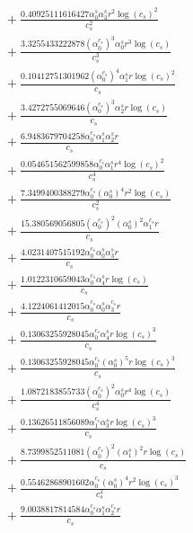 \documentclass[10pt]{article}
\begin{document}
\begin{align*}
&{}  + \frac{0.40925111616427 \alpha_{0}^s \alpha_{3}^s r^{2} \log{\left(c_{s} \right)}^{2}}{c_{s}^{2}} \\
&{}  + \frac{3.3255433222878 \left(\alpha_{0}^{c_s}\right)^{3} \alpha_{0}^s r^{3} \log{\left(c_{s} \right)}}{c_{s}^{3}} \\
&{}  + \frac{0.10412751301962 \left(\alpha_{0}^{c_s}\right)^{4} \alpha_{1}^s r \log{\left(c_{s} \right)}^{2}}{c_{s}} \\
&{}  + \frac{3.4272755069646 \left(\alpha_{0}^{c_s}\right)^{3} \alpha_{2}^s r \log{\left(c_{s} \right)}}{c_{s}} \\
&{}  + \frac{6.9483679704258 \alpha_{0}^{c_s} \alpha_{1}^s \alpha_{2}^s r}{c_{s}} \\
&{}  + \frac{0.054651562599858 \alpha_{0}^{c_s} \alpha_{1}^s r^{4} \log{\left(c_{s} \right)}^{2}}{c_{s}^{4}} \\
&{}  + \frac{7.3499400388279 \alpha_{0}^{c_s} \left(\alpha_{0}^s\right)^{4} r^{2} \log{\left(c_{s} \right)}}{c_{s}^{2}} \\
&{}  + \frac{15.380569056805 \left(\alpha_{0}^{c_s}\right)^{2} \left(\alpha_{0}^s\right)^{2} \alpha_{1}^{c_s} r}{c_{s}} \\
&{}  + \frac{4.0231407515192 \alpha_{0}^{c_s} \alpha_{0}^s \alpha_{3}^s r}{c_{s}} \\
&{}  + \frac{1.0122310659043 \alpha_{0}^{c_s} \alpha_{4}^s r \log{\left(c_{s} \right)}}{c_{s}} \\
&{}  + \frac{4.1224061412015 \alpha_{0}^{c_s} \alpha_{0}^s \alpha_{3}^{c_s} r}{c_{s}} \\
&{}  + \frac{0.13063255928045 \alpha_{0}^{c_s} \alpha_{4}^s r \log{\left(c_{s} \right)}^{3}}{c_{s}} \\
&{}  + \frac{0.13063255928045 \alpha_{0}^{c_s} \left(\alpha_{0}^s\right)^{5} r \log{\left(c_{s} \right)}^{3}}{c_{s}} \\
&{}  + \frac{1.0872183855733 \left(\alpha_{0}^{c_s}\right)^{2} \alpha_{0}^s r^{4} \log{\left(c_{s} \right)}}{c_{s}^{4}} \\
&{}  + \frac{0.13626511856089 \alpha_{1}^{c_s} \alpha_{3}^s r \log{\left(c_{s} \right)}^{3}}{c_{s}} \\
&{}  + \frac{8.7399852511081 \left(\alpha_{0}^{c_s}\right)^{2} \left(\alpha_{1}^s\right)^{2} r \log{\left(c_{s} \right)}}{c_{s}} \\
&{}  + \frac{0.55462868901602 \alpha_{0}^{c_s} \left(\alpha_{0}^s\right)^{4} r^{2} \log{\left(c_{s} \right)}^{3}}{c_{s}^{2}} \\
&{}  + \frac{9.0038817814584 \alpha_{0}^{c_s} \alpha_{1}^s \alpha_{2}^{c_s} r}{c_{s}} \\

\end{align*}
\end{document}
